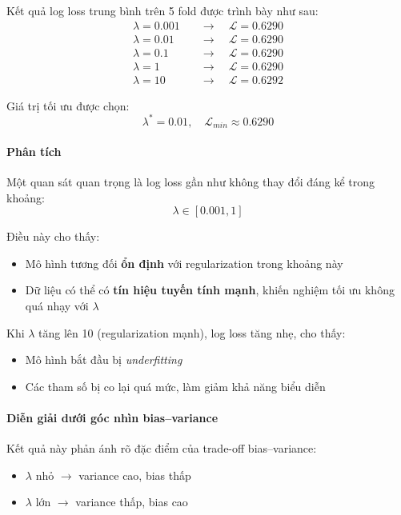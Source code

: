Kết quả log loss trung bình trên 5 fold được trình bày như sau:
\[
\begin{aligned}
\lambda = 0.001 & \quad \rightarrow \quad \mathcal{L} = 0.6290 \\
\lambda = 0.01  & \quad \rightarrow \quad \mathcal{L} = 0.6290 \\
\lambda = 0.1   & \quad \rightarrow \quad \mathcal{L} = 0.6290 \\
\lambda = 1     & \quad \rightarrow \quad \mathcal{L} = 0.6290 \\
\lambda = 10    & \quad \rightarrow \quad \mathcal{L} = 0.6292
\end{aligned}
\]

Giá trị tối ưu được chọn:
\[
\lambda^* = 0.01, \quad \mathcal{L}_{min} \approx 0.6290
\]

\paragraph{Phân tích}

Một quan sát quan trọng là log loss gần như không thay đổi đáng kể trong khoảng:
\[
\lambda \in [0.001, 1]
\]

Điều này cho thấy:
\begin{itemize}
    \item Mô hình tương đối \textbf{ổn định} với regularization trong khoảng này
    \item Dữ liệu có thể có \textbf{tín hiệu tuyến tính mạnh}, khiến nghiệm tối ưu không quá nhạy với $\lambda$
\end{itemize}

Khi $\lambda$ tăng lên 10 (regularization mạnh), log loss tăng nhẹ, cho thấy:
\begin{itemize}
    \item Mô hình bắt đầu bị \textit{underfitting}
    \item Các tham số bị co lại quá mức, làm giảm khả năng biểu diễn
\end{itemize}

\paragraph{Diễn giải dưới góc nhìn bias--variance}

Kết quả này phản ánh rõ đặc điểm của trade-off bias--variance:
\begin{itemize}
    \item $\lambda$ nhỏ $\rightarrow$ variance cao, bias thấp
    \item $\lambda$ lớn $\rightarrow$ variance thấp, bias cao
\end{itemize}

